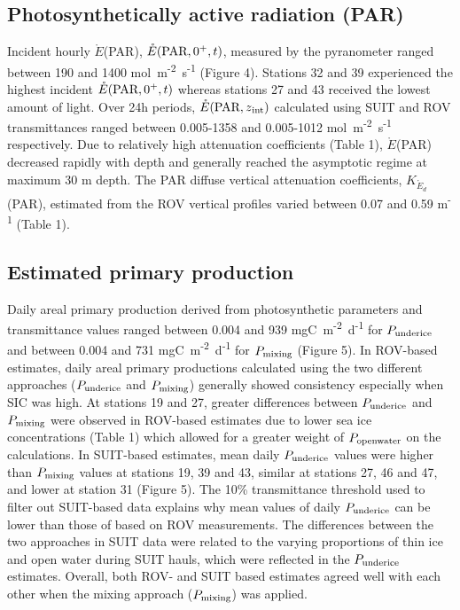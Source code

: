 \documentclass[draft]{agujournal2018}
\newcommand{\kdparscalar}{\ensuremath{K_{\mathring{E}_d}}(\textnormal{PAR})}
\newcommand{\eparscalar}{\ensuremath{\mathring{E}}(\textnormal{PAR})}
\newcommand{\eparzintscalar}{\ensuremath{\mathring{E}(\textnormal{PAR}, z\textsubscript{int})}}
\newcommand{\eparzeroscalar}{\ensuremath{\mathring{E}(\textnormal{PAR}, 0^+, t)}}
\newcommand{\ppopenwater}{\ensuremath{P_{\textnormal{\scriptsize openwater}}}}
\newcommand{\ppmixing}{\ensuremath{P_{\textnormal{\scriptsize mixing}}}}
\newcommand{\ppunderice}{\ensuremath{P_{\textnormal{\scriptsize underice}}}}
\newcommand{\micromol}{\textmu mol~m\textsuperscript{-2}~s\textsuperscript{-1}}
\newcommand{\dailypp}{mgC~m\textsuperscript{-2}~d\textsuperscript{-1}}
\begin{document}
\subsection{Photosynthetically active radiation (PAR)}

Incident hourly \eparscalar{}, \eparzeroscalar{}, measured by the pyranometer ranged between 190 and 1400 \micromol{} (Figure 4). Stations 32 and 39 experienced the highest incident \eparzeroscalar{} whereas stations 27 and 43 received the lowest amount of light. Over 24h periods, \eparzintscalar{} calculated using SUIT and ROV transmittances ranged between 0.005-1358 and 0.005-1012 \micromol{} respectively. Due to relatively high attenuation coefficients (Table 1), \eparscalar{} decreased rapidly with depth and generally reached the asymptotic regime at maximum 30 m depth. The PAR diffuse vertical attenuation coefficients, \kdparscalar{}, estimated from the ROV vertical profiles varied between 0.07 and 0.59 m\textsuperscript{-1} (Table 1).

\subsection{Estimated primary production}

Daily areal primary production derived from photosynthetic parameters and transmittance values ranged between 0.004 and 939 \dailypp{} for \ppunderice{} and between 0.004 and 731 \dailypp{} for \ppmixing{} (Figure 5). In ROV-based estimates, daily areal primary productions calculated using the two different approaches (\ppunderice{} and \ppmixing{}) generally showed consistency especially when SIC was high. At stations 19 and 27, greater differences between \ppunderice{} and \ppmixing{} were observed in ROV-based estimates due to lower sea ice concentrations (Table 1) which allowed for a greater weight of \ppopenwater{} on the calculations. In SUIT-based estimates, mean daily \ppunderice{} values were higher than \ppmixing{} values at stations 19, 39 and 43, similar at stations 27, 46 and 47, and lower at station 31 (Figure 5). The 10\% transmittance threshold used to filter out SUIT-based data explains why mean values of daily \ppunderice{} can be lower than those of based on ROV measurements. The differences between the two approaches in SUIT data were related to the varying proportions of thin ice and open water during SUIT hauls, which were reflected in the \ppunderice{} estimates. Overall, both ROV- and SUIT based estimates agreed well with each other when the mixing approach (\ppmixing{}) was applied.
\end{document}
